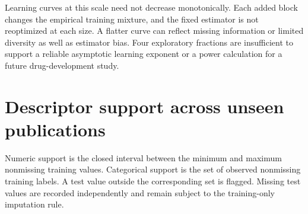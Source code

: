 \documentclass[11pt]{article}
\begin{document}
Learning curves at this scale need not decrease monotonically. Each added block changes the empirical training mixture, and the fixed estimator is not reoptimized at each size. A flatter curve can reflect missing information or limited diversity as well as estimator bias. Four exploratory fractions are insufficient to support a reliable asymptotic learning exponent or a power calculation for a future drug-development study.

\section{Descriptor support across unseen publications}
Numeric support is the closed interval between the minimum and maximum nonmissing training values. Categorical support is the set of observed nonmissing training labels. A test value outside the corresponding set is flagged. Missing test values are recorded independently and remain subject to the training-only imputation rule.
\end{document}
